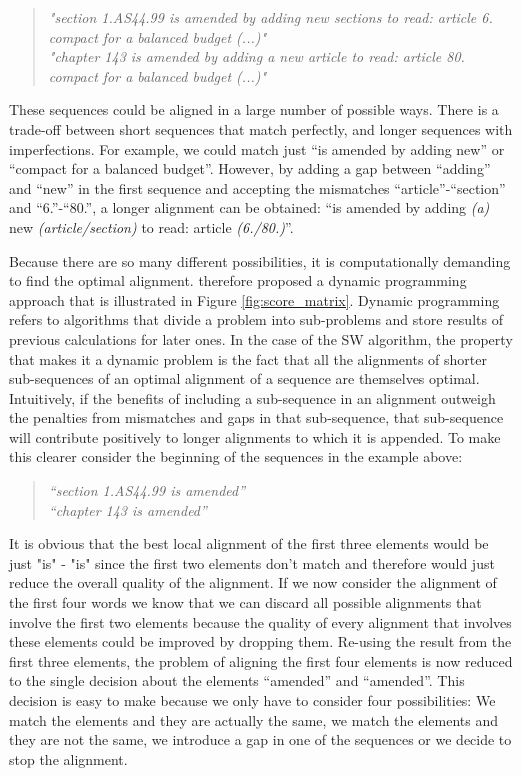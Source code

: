 \documentclass[12pt]{article} %
\begin{document}
\begin{quote}
\textit{"section 1.AS44.99 is amended by adding new sections to read: article 6. compact for a balanced budget (...)"} \\
\textit{"chapter 143 is amended by adding a new article to read: article 80. compact for a balanced budget (...)"}
\end{quote}

These sequences could be aligned in a large number of possible ways. There is a trade-off between short sequences that match perfectly, and longer sequences with imperfections. For example, we could match just ``is amended by adding new'' or ``compact for a balanced budget''. However, by adding a gap between ``adding'' and ``new'' in the first sequence and accepting the mismatches ``article''-``section'' and ``6.''-``80.'', a longer alignment can be obtained: ``is amended by adding \textit{(a)} new \textit{(article/section)} to read: article \textit{(6./80.)}''. 

Because there are so many different possibilities, it is computationally demanding to find the optimal alignment. \citet{smith1981identification} therefore proposed a dynamic programming approach that is illustrated in Figure \ref{fig:score_matrix}. Dynamic programming refers to algorithms that divide a problem into sub-problems and store results of previous calculations for later ones. In the case of the SW algorithm, the property that makes it a dynamic problem is the fact that all the alignments of shorter sub-sequences of an optimal alignment of a sequence are themselves optimal. Intuitively, if the benefits of including a sub-sequence in an alignment outweigh the penalties from mismatches and gaps in that sub-sequence, that sub-sequence will contribute positively to longer alignments to which it is appended. To make this clearer consider the beginning of the sequences in the example above:

\begin{quote}
\textit{``section 1.AS44.99 is amended''}\\
\textit{``chapter 143 is amended''}
\end{quote}

It is obvious that the best local alignment of the first three elements would be just "is" - "is" since the first two elements don't match and therefore would just reduce the overall quality of the alignment. If we now consider the alignment of the first four words we know that we can discard all possible alignments that involve the first two elements because the quality of every alignment that involves these elements could be improved by dropping them. Re-using the result from the first three elements, the problem of aligning the first four elements is now reduced to the single decision about the elements ``amended'' and ``amended''. This decision is easy to make because we only have to consider four possibilities: We match the elements and they are actually the same, we match the elements and they are not the same, we introduce a gap in one of the sequences or we decide to stop the alignment. 
\end{document}
